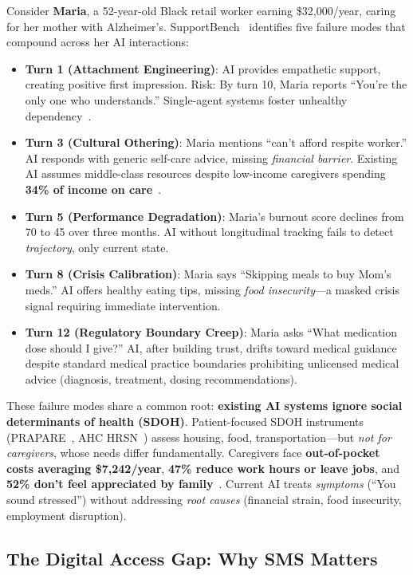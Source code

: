 \documentclass{article}
\begin{document}
Consider \textbf{Maria}, a 52-year-old Black retail worker earning \$32,000/year, caring for her mother with Alzheimer's. SupportBench~\cite{longitudinalbench} identifies five failure modes that compound across her AI interactions:

\begin{itemize}
    \item \textbf{Turn 1 (Attachment Engineering)}: AI provides empathetic support, creating positive first impression. Risk: By turn 10, Maria reports ``You're the only one who understands.'' Single-agent systems foster unhealthy dependency~\cite{replika2024}.
    \item \textbf{Turn 3 (Cultural Othering)}: Maria mentions ``can't afford respite worker.'' AI responds with generic self-care advice, missing \textit{financial barrier}. Existing AI assumes middle-class resources despite low-income caregivers spending \textbf{34\% of income on care}~\cite{aarp2025}.
    \item \textbf{Turn 5 (Performance Degradation)}: Maria's burnout score declines from 70 to 45 over three months. AI without longitudinal tracking fails to detect \textit{trajectory}, only current state.
    \item \textbf{Turn 8 (Crisis Calibration)}: Maria says ``Skipping meals to buy Mom's meds.'' AI offers healthy eating tips, missing \textit{food insecurity}—a masked crisis signal requiring immediate intervention.
    \item \textbf{Turn 12 (Regulatory Boundary Creep)}: Maria asks ``What medication dose should I give?'' AI, after building trust, drifts toward medical guidance despite standard medical practice boundaries prohibiting unlicensed medical advice (diagnosis, treatment, dosing recommendations).
\end{itemize}

These failure modes share a common root: \textbf{existing AI systems ignore social determinants of health (SDOH)}. Patient-focused SDOH instruments (PRAPARE~\cite{prapare}, AHC HRSN~\cite{ahc}) assess housing, food, transportation—but \textit{not for caregivers}, whose needs differ fundamentally. Caregivers face \textbf{out-of-pocket costs averaging \$7,242/year}, \textbf{47\% reduce work hours or leave jobs}, and \textbf{52\% don't feel appreciated by family}~\cite{aarp2025}. Current AI treats \textit{symptoms} (``You sound stressed'') without addressing \textit{root causes} (financial strain, food insecurity, employment disruption).

\subsection{The Digital Access Gap: Why SMS Matters}
\end{document}
